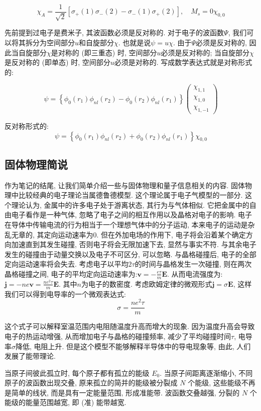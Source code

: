 \[
\chi_A = \frac{1}{\sqrt{2}} \left[ \sigma_+(1)\sigma_-(2) - \sigma_-(1)\sigma_+(2) \right], \quad M_s = 0 \chi_{0,0}
\]

先前提到过电子是费米子, 其波函数必须是反对称的. 对于电子的波函数$\Psi$, 我们可以将其拆分为空间部分$u$和自旋部分$\chi$. 也就是说$\psi = u \chi$. 由于$\Psi$必须是反对称的, 因此当自旋部分$\chi$是对称的 (即三重态) 时, 空间部分$u$必须是反对称的; 当自旋部分$\chi$是反对称的 (即单态) 时, 空间部分$u$必须是对称的. 写成数学表达式就是对称形式的:

\[
\psi = \left\{ \phi_0(r_1) \phi_{nl}(r_2) - \phi_0(r_2) \phi_{nl}(r_1) \right\}\begin{pmatrix}
\chi_{1,1} \\[2pt]
\chi_{1,0} \\[2pt]
\chi_{1,-1}
\end{pmatrix}
\]

反对称形式的:
\[
\psi = \left\{ \phi_0(r_1) \phi_{nl}(r_2) + \phi_0(r_2) \phi_{nl}(r_1) \right\} \chi_{0, 0}
\]

\subsection{固体物理简说}
作为笔记的结尾, 让我们简单介绍一些与固体物理和量子信息相关的内容. 固体物理中比较经典的电子理论当属德鲁德模型. 这个理论属于电子气模型的一部分. 这个理论认为, 金属中的许多电子处于游离状态, 其行为与气体相似. 它把金属中的自由电子看作是一种气体, 忽略了电子之间的相互作用以及晶格对电子的影响. 电子在导体中传输电流的行为相当于一个理想气体中的分子运动, 本来电子的运动是杂乱无章的, 其定向运动速率为$0$. 但在外加电场的作用下, 电子将会沿着某个确定方向加速直到其发生碰撞, 否则电子将会无限加速下去, 显然与事实不符. 与其余电子发生的碰撞由于动量交换以及电子不可区分, 可以忽略. 与晶格碰撞后, 电子的全部定向运动速率将会失去. 考虑电子以平均$2\tau$的时间与晶格发生一次碰撞, 则在两次晶格碰撞之间, 电子的平均定向运动速率为:$\bm{v} = -\frac{e\tau}{m}\bm{E}$. 从而电流强度为:$\bm{j} = -n e \bm{v} = \frac{n e^2 \tau}{m}\bm{E}$. 其中$n$为电子的数密度. 考虑欧姆定律的微观形式$\bm{j} = \sigma \bm{E}$, 这样我们可以得到电导率的一个微观表达式:
\[
\sigma = \frac{n e^2 \tau}{m}
\]

这个式子可以解释室温范围内电阻随温度升高而增大的现象. 因为温度升高会导致电子的热运动增强, 从而增加电子与晶格的碰撞频率, 减少了平均碰撞时间$\tau$, 电导率$\sigma$降低, 电阻上升. 但是这个模型不能够解释半导体中的导电现象等, 由此, 人们发展了能带理论.

当原子间彼此孤立时, 每个原子都有孤立的能级 \( E_0 \). 当原子间距离逐渐缩小, 不同原子的波函数出现交叠, 原来孤立的简并的能级被分裂成 \( N \) 个能级, 这些能级不再是简单的线状, 而是具有一定能量范围, 形成准能带. 波函数交叠越强, 分裂的 \( N \) 个能级的能量范围越宽, 即 (准) 能带越宽.

